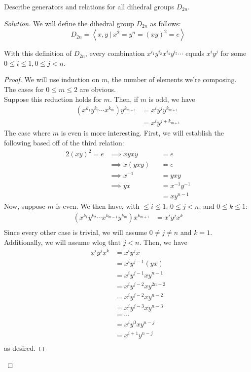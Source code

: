 \documentclass[12pt]{article}
\newenvironment{problem}[2][Problem]{\begin{trivlist}
\item[\hskip \labelsep {\bfseries #1}\hskip \labelsep {\bfseries #2.}]}{\end{trivlist}}
\newenvironment{proposition}[1][Proposition]{\begin{trivlist}
\item[\hskip \labelsep {\bfseries #1.}]}{\end{trivlist}}
\newenvironment{solution}
  {\renewcommand\qedsymbol{$\blacksquare$}\begin{proof}[Solution]}
{\end{proof}}
\begin{document}
\begin{problem}{2.5}
  Describe generators and relations for all dihedral groups $D_{2n}$.
\end{problem}
\begin{solution}
  We will define the dihedral group $D_{2n}$ as follows:
  \begin{equation*}
    D_{2n} = \left<x, y\ |\ x^2 = y^n = (xy)^2 = e\right>
  \end{equation*}
  \begin{proposition}
    With this definition of $D_{2n}$, every combination 
    $x^{i_1}y^{i_2}x^{i_4}y^{i_5}\cdots$ equals $x^iy^j$ 
    for some $0 \leq i \leq 1, 0 \leq j < n$.
  \end{proposition}
  \begin{proof}
    We will use induction on $m$, the number of elements we're composing. \\
    The cases for $0 \leq m \leq 2$ are obvious. \\
    Suppose this reduction holds for $m$. 
    Then, if $m$ is odd, we have
    \begin{align*}
      \left(x^{k_1}y^{k_2}\cdots x^{k_m}\right)y^{k_{m+1}}
      &= x^iy^jy^{k_{m+1}} \\
      &= x^iy^{j+k_{m+1}}
    \end{align*}
    The case where $m$ is even is more interesting. First, we will establish
    the following based off of the third relation:
    \begin{alignat*}{2}
      (xy)^2 = e &\implies xyxy &&= e \\
      &\implies x(yxy) &&= e \\
      &\implies x^{-1} &&=  yxy \\
      &\implies yx &&= x^{-1}y^{-1} \\
      &&&= xy^{n-1}
    \end{alignat*}
    Now, suppose $m$ is even. We then have, 
    with $\leq i \leq 1$, $0\leq j < n$, and $0\leq k \leq 1$:
    \begin{align*}
      \left(x^{k_1}y^{k_2}\cdots x^{k_{m-1}}y^{k_m}\right)x^{k_{m+1}}
      &= x^iy^jx^k \\
    \end{align*}
    Since every other case is trivial, we will assume
    $0 \neq j \neq n$ and $k = 1$. 
    Additionally, we will assume wlog that $j < n$.
    Then, we have
    \begin{align*}
      x^iy^jx^k &= x^iy^jx\\
      &= x^iy^{j-1}(yx)\\
      &= x^iy^{j-1}xy^{n-1}\\
      &= x^iy^{j-2}xy^{2n-2}\\
      &= x^iy^{j-2}xy^{n-2}\\
      &= x^iy^{j-3}xy^{n-3}\\
      &= \cdots \\
      &= x^iy^0xy^{n-j} \\
      &= x^{i+1}y^{n-j} \\
    \end{align*}
    as desired.
  \end{proof}
\end{solution}
\end{document}
